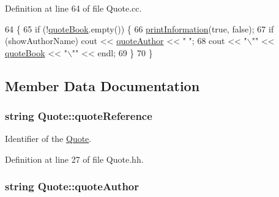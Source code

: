 Definition at line 64 of file Quote.\+cc.


\begin{DoxyCode}
64                                                        \{
65     \textcolor{keywordflow}{if} (!\hyperlink{class_quote_a7e6968e086bdd45b40627a37ecbbf6fc}{quoteBook}.empty()) \{
66         \hyperlink{class_quote_a0854af3d11ff805991e87ef6e9bebf69}{printInformation}(\textcolor{keyword}{true}, \textcolor{keyword}{false});
67         \textcolor{keywordflow}{if} (showAuthorName) cout << \hyperlink{class_quote_a930113c4ee0ae5e5506bbc1ea3e79b49}{quoteAuthor} << \textcolor{stringliteral}{" "};
68         cout << \textcolor{stringliteral}{"\(\backslash\)""} << \hyperlink{class_quote_a7e6968e086bdd45b40627a37ecbbf6fc}{quoteBook} << \textcolor{stringliteral}{"\(\backslash\)""} << endl;
69     \}
70 \}\end{DoxyCode}


\subsection{Member Data Documentation}
\subsubsection[{\texorpdfstring{quote\+Reference}{quoteReference}}]{\setlength{\rightskip}{0pt plus 5cm}string Quote\+::quote\+Reference\hspace{0.3cm}{\ttfamily [private]}}\hypertarget{class_quote_a9c7b2deff2ee9a0a216c360fe304202a}{}\label{class_quote_a9c7b2deff2ee9a0a216c360fe304202a}


Identifier of the \hyperlink{class_quote}{Quote}. 



Definition at line 27 of file Quote.\+hh.

\subsubsection[{\texorpdfstring{quote\+Author}{quoteAuthor}}]{\setlength{\rightskip}{0pt plus 5cm}string Quote\+::quote\+Author\hspace{0.3cm}{\ttfamily [private]}}\hypertarget{class_quote_a930113c4ee0ae5e5506bbc1ea3e79b49}{}\label{class_quote_a930113c4ee0ae5e5506bbc1ea3e79b49}


